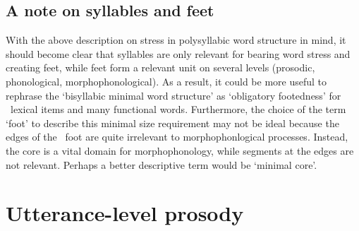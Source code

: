\subsection{A note on syllables and feet}\label{footedness}
With the above description on stress in polysyllabic word structure in mind, it should become clear that syllables are only relevant for bearing word stress and creating feet, while feet form a relevant unit on several levels (prosodic, phonological, morphophonological). As a result, it could be more useful to rephrase the ‘bisyllabic minimal word structure’ as ‘obligatory footedness’ for \PS\ lexical items and many functional words. Furthermore, the choice of the term ‘foot’ to describe this minimal size requirement may not be ideal because the edges of the \PS\ foot are quite irrelevant to morphophonlogical processes. Instead, the  core is a vital domain for morphophonology, while segments at the edges are not relevant. Perhaps a better descriptive term would be ‘minimal core’.


\section{Utterance-level prosody}\label{utteranceProsody}

